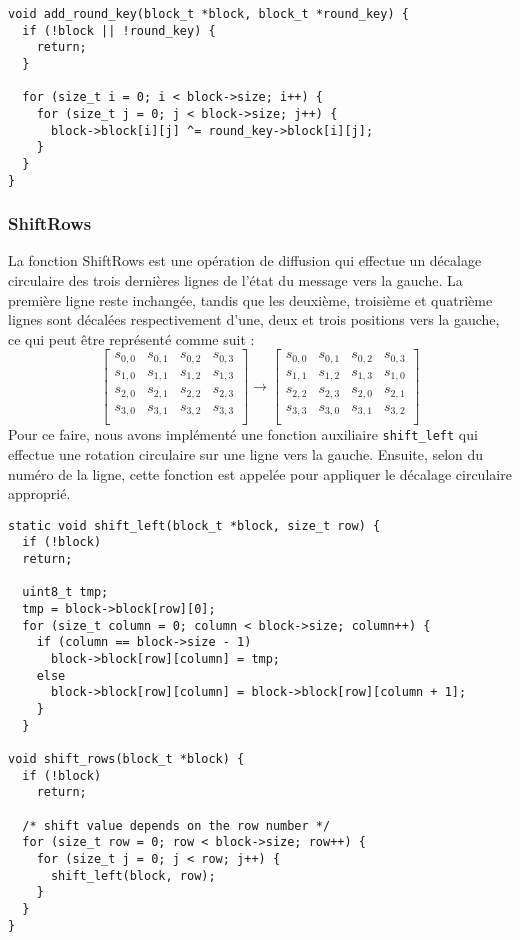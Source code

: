 \documentclass[a4paper, 10pt]{article}
\begin{document}
    \begin{verbatim}
void add_round_key(block_t *block, block_t *round_key) {
  if (!block || !round_key) {
    return;
  }

  for (size_t i = 0; i < block->size; i++) {
    for (size_t j = 0; j < block->size; j++) {
      block->block[i][j] ^= round_key->block[i][j];
    }
  }
}
    \end{verbatim}
  

  \subsubsection{ShiftRows}
  La fonction ShiftRows est une opération de diffusion qui effectue un décalage circulaire des trois dernières lignes de l’état du message vers 
  la gauche. La première ligne reste inchangée, tandis que les deuxième, troisième et quatrième lignes sont décalées respectivement d'une, deux 
  et trois positions vers la gauche, ce qui peut être représenté comme suit :
  \[
    \begin{bmatrix}
      s_{0,0}&s_{0,1}& s_{0,2}&s_{0,3}\\
      s_{1,0}&s_{1,1}& s_{1,2}&s_{1,3}\\
      s_{2,0}&s_{2,1}& s_{2,2}&s_{2,3}\\
      s_{3,0}&s_{3,1}& s_{3,2}&s_{3,3}\\
    \end{bmatrix}
    \rightarrow
    \begin{bmatrix}
      s_{0,0}&s_{0,1}& s_{0,2}&s_{0,3}\\
      s_{1,1}& s_{1,2}& s_{1,3}&s_{1,0}\\
      s_{2,2}&s_{2,3}& s_{2,0}&s_{2,1}\\
      s_{3,3}&s_{3,0}&s_{3,1}& s_{3,2}\\
    \end{bmatrix}
  \]
  Pour ce faire, nous avons implémenté une fonction auxiliaire \texttt{shift\_left} qui effectue une rotation circulaire sur une ligne vers la gauche. 
  Ensuite, selon du numéro de la ligne, cette fonction est appelée pour appliquer le décalage circulaire approprié.

\small{
\begin{verbatim}
static void shift_left(block_t *block, size_t row) {
  if (!block)
  return;

  uint8_t tmp;
  tmp = block->block[row][0];
  for (size_t column = 0; column < block->size; column++) {
    if (column == block->size - 1)
      block->block[row][column] = tmp;
    else
      block->block[row][column] = block->block[row][column + 1];
    }
  }

void shift_rows(block_t *block) {
  if (!block)
    return;

  /* shift value depends on the row number */
  for (size_t row = 0; row < block->size; row++) {
    for (size_t j = 0; j < row; j++) {
      shift_left(block, row);
    }
  }
}
\end{verbatim}
}
  
\end{document}
